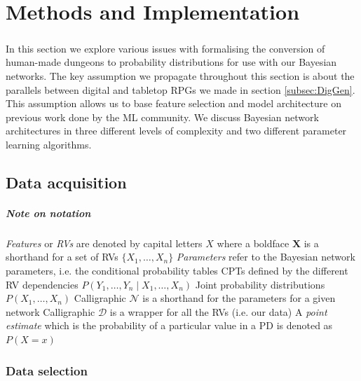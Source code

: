 \documentclass{UoYCSproject}
\begin{document}
\chapter{Methods and Implementation}

\paragraph{}
In this section we explore various issues with formalising the conversion of human-made dungeons to probability distributions for use with our Bayesian networks. The key assumption we propagate throughout this section is about the parallels between digital and tabletop RPGs we made in section \ref{subsec:DigGen}. This assumption allows us to base feature selection and model architecture  on previous work done by the ML community. We discuss Bayesian network architectures in three different levels of complexity and two different parameter learning algorithms.

\section{Data acquisition}

\paragraph{Note on notation}
\begin{outline}
  \1 \textit{Features} or \textit{RVs} are denoted by capital letters \(X\) where a boldface \(\boldsymbol{X}\) is a shorthand for a set of RVs \(\{X_1, \ldots, X_n\}\)
  \1 \textit{Parameters} refer to the Bayesian network parameters, i.e. the conditional probability tables CPTs defined by the different RV dependencies \(P(Y_1, \ldots, Y_n \mid X_1, \ldots , X_n)\)
  \1 Joint probability distributions \(P(X_1, \ldots , X_n)\)
  \1 Calligraphic \(\mathcal{N}\) is a shorthand for the parameters for a given network
  \1 Calligraphic \(\mathcal{D}\) is a wrapper for all the RVs (i.e. our data)
  \1 A \textit{point estimate} which is the probability of a particular value in a PD is denoted as \(P(X = x)\)
\end{outline}

\subsection{Data selection} %
\end{document}
